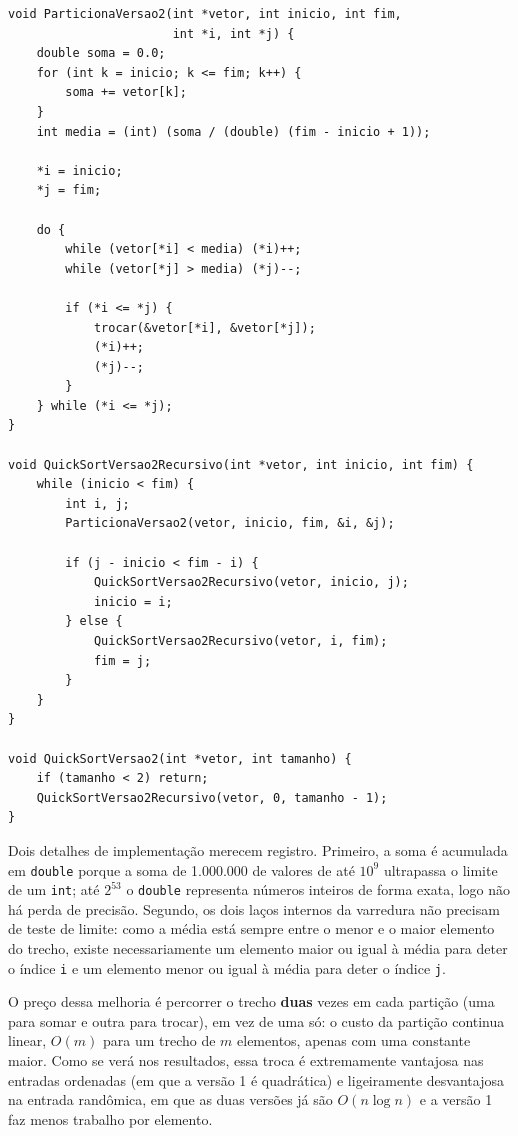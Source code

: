 \begin{verbatim}
void ParticionaVersao2(int *vetor, int inicio, int fim,
                       int *i, int *j) {
    double soma = 0.0;
    for (int k = inicio; k <= fim; k++) {
        soma += vetor[k];
    }
    int media = (int) (soma / (double) (fim - inicio + 1));

    *i = inicio;
    *j = fim;

    do {
        while (vetor[*i] < media) (*i)++;
        while (vetor[*j] > media) (*j)--;

        if (*i <= *j) {
            trocar(&vetor[*i], &vetor[*j]);
            (*i)++;
            (*j)--;
        }
    } while (*i <= *j);
}

void QuickSortVersao2Recursivo(int *vetor, int inicio, int fim) {
    while (inicio < fim) {
        int i, j;
        ParticionaVersao2(vetor, inicio, fim, &i, &j);

        if (j - inicio < fim - i) {
            QuickSortVersao2Recursivo(vetor, inicio, j);
            inicio = i;
        } else {
            QuickSortVersao2Recursivo(vetor, i, fim);
            fim = j;
        }
    }
}

void QuickSortVersao2(int *vetor, int tamanho) {
    if (tamanho < 2) return;
    QuickSortVersao2Recursivo(vetor, 0, tamanho - 1);
}
\end{verbatim}

\qquad Dois detalhes de implementação merecem registro. Primeiro, a
soma é acumulada em \texttt{double} porque a soma de 1.000.000 de
valores de até $10^9$ ultrapassa o limite de um \texttt{int}; até
$2^{53}$ o \texttt{double} representa números inteiros de forma
exata, logo não há perda de precisão. Segundo, os dois laços internos
da varredura não precisam de teste de limite: como a média está
sempre entre o menor e o maior elemento do trecho, existe
necessariamente um elemento maior ou igual à média para deter o
índice \texttt{i} e um elemento menor ou igual à média para deter o
índice \texttt{j}.

\qquad O preço dessa melhoria é percorrer o trecho \textbf{duas} vezes
em cada partição (uma para somar e outra para trocar), em vez de uma
só: o custo da partição continua linear, $O(m)$ para um trecho de $m$
elementos, apenas com uma constante maior. Como se verá nos
resultados, essa troca é extremamente vantajosa nas entradas
ordenadas (em que a versão 1 é quadrática) e ligeiramente
desvantajosa na entrada randômica, em que as duas versões já são
$O(n \log n)$ e a versão 1 faz menos trabalho por elemento.


